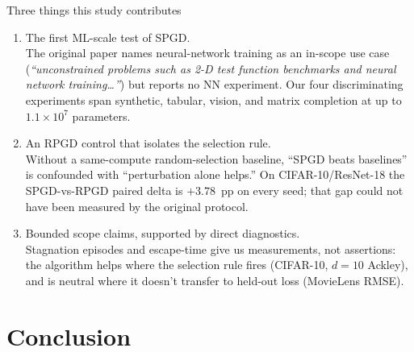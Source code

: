 \documentclass[11pt,aspectratio=169]{beamer}
\begin{document}
\begin{frame}{Three things this study contributes}
  \begin{enumerate}\setlength\itemsep{0.45em}
    \item \alert{The first ML-scale test of SPGD.}\\
          The original paper names neural-network training as an
          in-scope use case (\emph{``unconstrained problems such as
          2-D test function benchmarks and neural network training\dots''})
          but reports no NN experiment. Our four discriminating
          experiments span synthetic, tabular, vision, and matrix
          completion at up to $1.1{\times}10^{7}$ parameters.
    \item \alert{An RPGD control that isolates the selection rule.}\\
          Without a same-compute random-selection baseline, ``SPGD
          beats baselines'' is confounded with ``perturbation alone
          helps.'' On CIFAR-10/ResNet-18 the SPGD-vs-RPGD paired delta
          is $+3.78$~pp on every seed; that gap could not have been
          measured by the original protocol.
    \item \alert{Bounded scope claims, supported by direct diagnostics.}\\
          Stagnation episodes and escape-time give us measurements,
          not assertions: the algorithm helps where the selection rule
          fires (CIFAR-10, $d{=}10$ Ackley), and is neutral where it
          doesn't transfer to held-out loss (MovieLens RMSE).
  \end{enumerate}
\end{frame}


\section{Conclusion}
\end{document}
